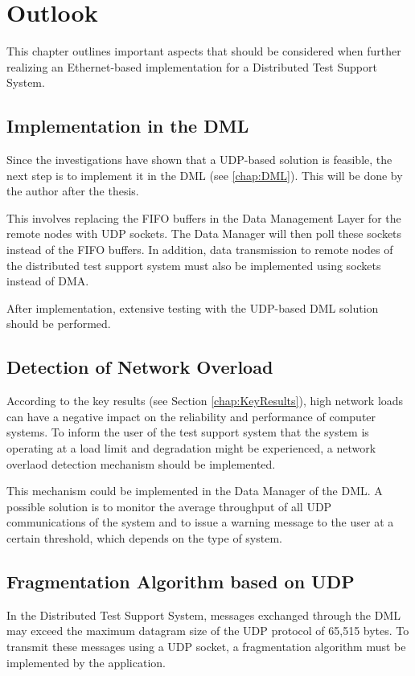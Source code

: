 \chapter{Outlook} \label{chap:Outlook}
This chapter outlines important aspects that should be considered when further realizing an Ethernet-based implementation for a Distributed Test Support System.

\section{Implementation in the DML}
Since the investigations have shown that a UDP-based solution is feasible, the next step is to implement it in the DML (see \ref{chap:DML}). This will be done by the author after the thesis.

This involves replacing the FIFO buffers in the Data Management Layer for the remote nodes with UDP sockets. The Data Manager will then poll these sockets instead of the FIFO buffers. In addition, data transmission to remote nodes of the distributed test support system must also be implemented using sockets instead of DMA.

After implementation, extensive testing with the UDP-based DML solution should be performed.

\section{Detection of Network Overload}
According to the key results (see Section \ref{chap:KeyResults}), high network loads can have a negative impact on the reliability and performance of computer systems. To inform the user of the test support system that the system is operating at a load limit and degradation might be experienced, a network overlaod detection mechanism should be implemented.

This mechanism could be implemented in the Data Manager of the DML. A possible solution is to monitor the average throughput of all UDP communications of the system and to issue a warning message to the user at a certain threshold, which depends on the type of system.

\section{Fragmentation Algorithm based on UDP} \label{chap:fragProposalOutlook}
In the Distributed Test Support System, messages exchanged through the DML may exceed the maximum datagram size of the UDP protocol of 65,515 bytes. To transmit these messages using a UDP socket, a fragmentation algorithm must be implemented by the application.

